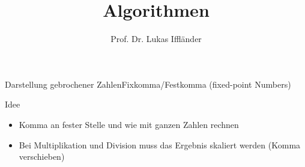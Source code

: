 \documentclass[xelatex,aspectratio=169]{beamer}
\title{Algorithmen}
\author{Prof. Dr. Lukas Iffländer}
\institute{HTW Dresden}
\date{}
\begin{document}
\begin{frame}{Darstellung gebrochener Zahlen}{Fixkomma/Festkomma (fixed-point Numbers)}

    \begin{block}{Idee}
        \begin{itemize}
            \item Komma an fester Stelle und wie mit ganzen Zahlen rechnen
            \item Bei Multiplikation und Division muss das Ergebnis skaliert werden (Komma verschieben)
        \end{itemize}
    \end{block}

\end{frame}

\end{document}
